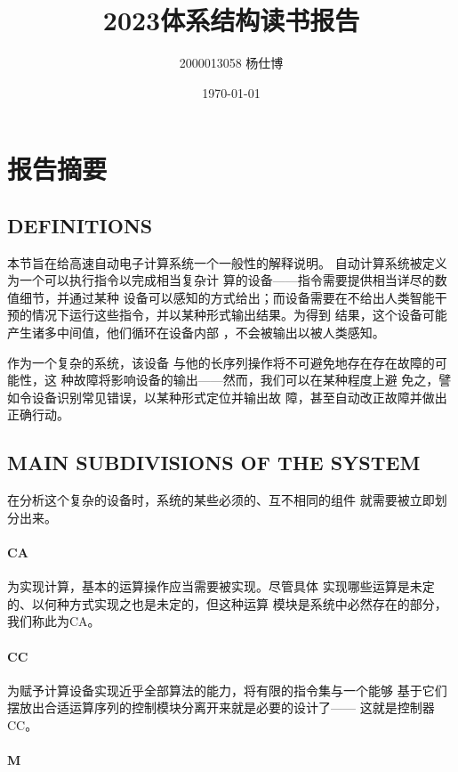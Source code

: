 \documentclass[UTF8]{ctexart}
\title{\vspace{-4cm}2023体系结构读书报告}
\author{2000013058 杨仕博}
\date{\today}
\begin{document}
\maketitle

\section{报告摘要}

\subsection{DEFINITIONS}

本节旨在给高速自动电子计算系统一个一般性的解释说明。
自动计算系统被定义为一个可以执行指令以完成相当复杂计
算的设备——指令需要提供相当详尽的数值细节，并通过某种
设备可以感知的方式给出；而设备需要在不给出人类智能干
预的情况下运行这些指令，并以某种形式输出结果。为得到
结果，这个设备可能产生诸多中间值，他们循环在设备内部
，不会被输出以被人类感知。

作为一个复杂的系统，该设备
与他的长序列操作将不可避免地存在存在故障的可能性，这
种故障将影响设备的输出——然而，我们可以在某种程度上避
免之，譬如令设备识别常见错误，以某种形式定位并输出故
障，甚至自动改正故障并做出正确行动。

\subsection{MAIN SUBDIVISIONS OF THE SYSTEM}

在分析这个复杂的设备时，系统的某些必须的、互不相同的组件
就需要被立即划分出来。

\paragraph{CA}

为实现计算，基本的运算操作应当需要被实现。尽管具体
实现哪些运算是未定的、以何种方式实现之也是未定的，但这种运算
模块是系统中必然存在的部分，我们称此为CA。

\paragraph{CC}

为赋予计算设备实现近乎全部算法的能力，将有限的指令集与一个能够
基于它们摆放出合适运算序列的控制模块分离开来就是必要的设计了——
这就是控制器CC。

\paragraph{M}
\end{document}
